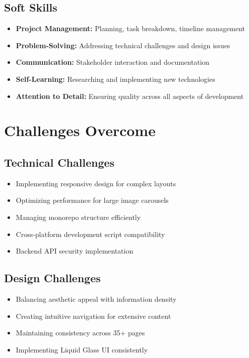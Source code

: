 \documentclass[12pt,a4paper]{report}
\begin{document}
\subsection*{Soft Skills}

\begin{itemize}
    \item \textbf{Project Management:} Planning, task breakdown, timeline management
    \item \textbf{Problem-Solving:} Addressing technical challenges and design issues
    \item \textbf{Communication:} Stakeholder interaction and documentation
    \item \textbf{Self-Learning:} Researching and implementing new technologies
    \item \textbf{Attention to Detail:} Ensuring quality across all aspects of development
\end{itemize}

\section{Challenges Overcome}

\subsection*{Technical Challenges}
\begin{itemize}
    \item Implementing responsive design for complex layouts
    \item Optimizing performance for large image carousels
    \item Managing monorepo structure efficiently
    \item Cross-platform development script compatibility
    \item Backend API security implementation
\end{itemize}

\subsection*{Design Challenges}
\begin{itemize}
    \item Balancing aesthetic appeal with information density
    \item Creating intuitive navigation for extensive content
    \item Maintaining consistency across 35+ pages
    \item Implementing Liquid Glass UI consistently
\end{itemize}
\end{document}
